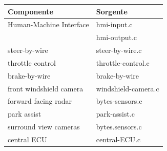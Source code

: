 \documentclass[11pt, openany]{article}
\theoremstyle{definition}
\theoremstyle{plain}
\theoremstyle{remark}
\begin{document}
			\begin{tcolorbox}[width=\textwidth,colback={Cornsilk2}]\label{tab:sorgenti}
				\begin{tabularx}{\textwidth}{p{8cm}  l}
					\textbf{Componente}			&	\textbf{Sorgente}	\\\toprule
					Human-Machine Interface 	& 	hmi-input.c			\\
												&	hmi-output.c		\\\midrule
					steer-by-wire				&	steer-by-wire.c		\\\midrule
					throttle control			&	throttle-control.c	\\\midrule
					brake-by-wire				&	brake-by-wire		\\\midrule
					front windshield camera		&	windshield-camera.c	\\\midrule
					forward facing radar		&	bytes-sensors.c		\\\midrule
					park assist					&	park-assist.c		\\\midrule
					surround view cameras		&	bytes.sensors.c		\\\midrule
					central ECU					&	central-ECU.c
				\end{tabularx}
			\end{tcolorbox}
\end{document}
